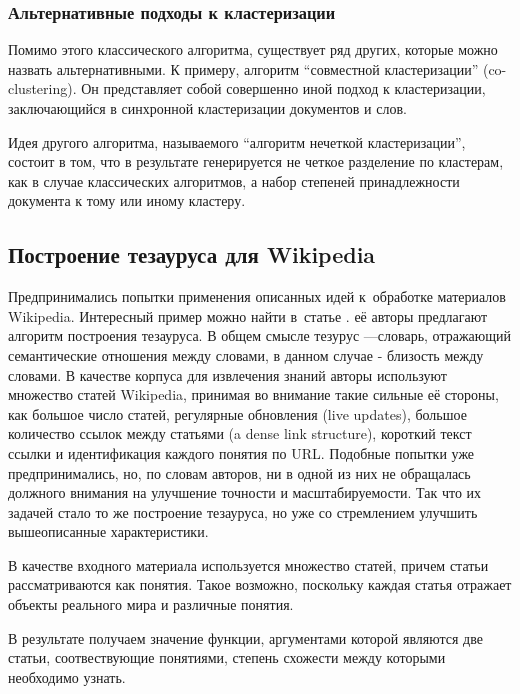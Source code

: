 \subsubsection{Альтернативные подходы к кластеризации}

Помимо этого классического алгоритма, существует ряд других, которые можно назвать альтернативными.
К примеру, алгоритм ``совместной кластеризации'' (co-clustering). 
Он представляет собой совершенно
иной подход к кластеризации, заключающийся в синхронной кластеризации документов и слов.

Идея другого алгоритма, называемого ``алгоритм нечеткой кластеризации'', состоит в том, что в результате
генерируется не четкое разделение по кластерам, как в случае классических алгоритмов, а набор степеней принадлежности
документа к тому или иному кластеру.

\subsection{Построение тезауруса для Wikipedia}

Предпринимались попытки применения описанных идей к~обработке материалов Wikipedia.
Интересный пример можно найти в~статье \cite{thesaurus}.
её авторы предлагают алгоритм построения тезауруса. В общем смысле тезурус ---словарь, %
отражающий семантические отношения между словами, в данном случае  - близость между 
словами.                                     
В качестве корпуса для извлечения знаний авторы используют множество статей Wikipedia,
принимая во внимание такие сильные её стороны, как большое число 
статей, регулярные обновления (live updates), большое количество ссылок между статьями 
(a dense link structure), короткий текст ссылки и идентификация каждого понятия по URL.
Подобные попытки уже предпринимались, но, по словам авторов, ни в одной из них не обращалась
должного внимания на улучшение точности и масштабируемости. Так что их задачей стало то же 
построение тезауруса, но уже со стремлением улучшить вышеописанные характеристики.

В качестве входного материала используется множество статей, причем статьи рассматриваются как понятия. 
Такое возможно, поскольку каждая статья отражает объекты реального мира и различные понятия.

В результате получаем значение функции, аргументами которой являются две статьи, соотвествующие понятиями,
степень схожести между которыми необходимо узнать.

